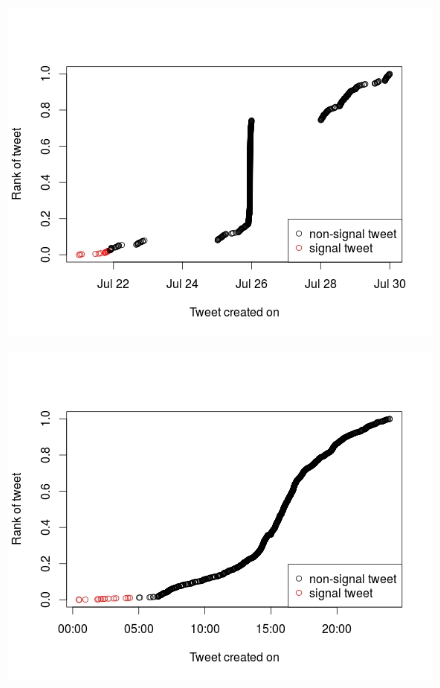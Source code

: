 \begin{figure}[H]
	\centering
	\begin{minipage}{.45\linewidth}
		\includegraphics[width=\linewidth]{images/rumor3.jpeg}
		\label{r3}
	\end{minipage}
	\hspace{.05\linewidth}
	\begin{minipage}{.45\linewidth}
		\includegraphics[width=\linewidth]{images/rumor4.jpeg}
		\label{r4}
	\end{minipage}
\end{figure}



